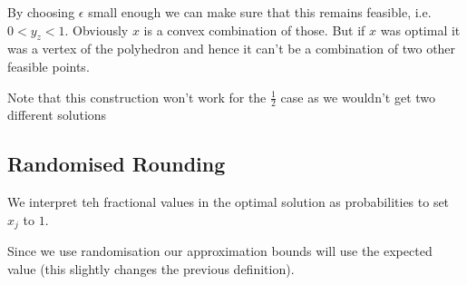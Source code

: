 \begin{Ex}
By choosing $\epsilon$ small enough we can make sure that this remains feasible, i.e. $0<y_z <1$. Obviously $x$ is a convex combination of those. But if $x$ was optimal it was a vertex of the polyhedron and hence it can't be a combination of two other feasible points.

Note that this construction won't work for the $\frac 12$ case as we wouldn't get two different solutions

\end{Ex}

\subsection{Randomised Rounding}

We interpret teh fractional values in the optimal solution as probabilities to set $x_j$ to $1$.

Since we use randomisation our approximation bounds will use the expected value (this slightly changes the previous definition).


